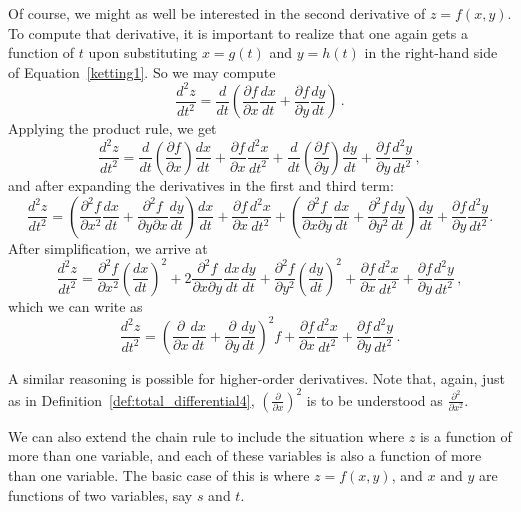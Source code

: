 \ifanalysis
Of course, we might as well be interested in the second derivative of $z=f(x,y)$. To compute that derivative, it is important to realize that one again gets a function of $t$ upon substituting $x=g(t)$ and $y=h(t)$ in the right-hand side of Equation~\eqref{ketting1}. So we may compute
$$
\frac{d^2z}{dt^2}=\frac{d}{dt}\left(\frac{\partial f}{\partial x}\frac{dx}{dt}+\frac{\partial f}{\partial y}\frac{dy}{dt}\right)\,.
$$
Applying the product rule, we get
$$
\frac{d^2z}{dt^2}=\frac{d}{dt}\left(\frac{\partial f}{\partial x}\right)\frac{dx}{dt}+\frac{\partial f}{\partial x}\frac{d^2x}{dt^2}+\frac{d}{dt}\left(\frac{\partial f}{\partial y}\right)\frac{dy}{dt}+\frac{\partial f}{\partial y}\frac{d^2y}{dt^2}\,, 
$$
and after expanding the derivatives in the first and third term:
$$
\frac{d^2z}{dt^2}=\left(\frac{\partial^2 f}{\partial x^2}\frac{dx}{dt}+\frac{\partial^2 f}{\partial y\partial x}\frac{dy}{dt}\right)\frac{dx}{dt}+\frac{\partial f}{\partial x}\frac{d^2x}{dt^2}+\left(\frac{\partial^2 f}{\partial x\partial y}\frac{dx}{dt}+\frac{\partial^2 f}{\partial y^2}\frac{dy}{dt}\right)\frac{dy}{dt}+\frac{\partial f}{\partial y}\frac{d^2y}{dt^2}.
$$
After simplification, we arrive at
$$
\frac{d^2z}{dt^2}=\frac{\partial^2 f}{\partial x^2}\left(\frac{dx}{dt}\right)^2+2\frac{\partial^2 f}{\partial x\partial y}\frac{dx}{dt}\frac{dy}{dt}+\frac{\partial^2 f}{\partial y^2}\left(\frac{dy}{dt}\right)^2+\frac{\partial f}{\partial x}\frac{d^2x}{dt^2}+\frac{\partial f}{\partial y}\frac{d^2y}{dt^2}\,,
$$
which we can write as
$$
\frac{d^2z}{dt^2}=\left(\frac{\partial }{\partial x}\frac{dx}{dt}+\frac{\partial }{\partial y}\frac{dy}{dt}\right)^2f+\frac{\partial f}{\partial x}\frac{d^2x}{dt^2}+\frac{\partial f}{\partial y}\frac{d^2y}{dt^2}\,.
$$

A similar reasoning is possible for higher-order derivatives. Note that, again, just as in Definition~\ref{def:total_differential4},  $\left(\frac{\partial}{\partial x}\right)^2$ is to be understood as $\frac{\partial^2}{\partial x^2}$.

\fi 
We can also extend the chain rule to include the situation where $z$ is a function of more than one variable, and each of these variables is also a function of more than one variable. The basic case of this is where $z=f(x,y)$, and $x$ and $y$ are functions of two variables, say $s$ and $t$. \\

